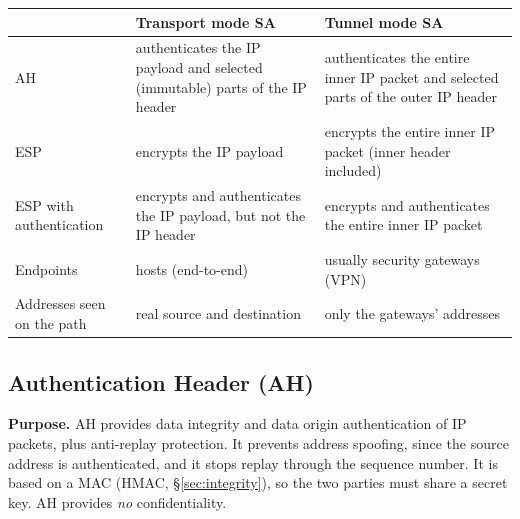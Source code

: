 \begin{center}\small
\begin{tabularx}{\textwidth}{@{}l *{2}{>{\raggedright\arraybackslash}X}@{}}
\toprule
 & Transport mode SA & Tunnel mode SA\\
\midrule
AH & authenticates the IP payload and selected (immutable) parts of the IP header & authenticates the entire inner IP packet and selected parts of the outer IP header\\
ESP & encrypts the IP payload & encrypts the entire inner IP packet (inner header included)\\
ESP with authentication & encrypts and authenticates the IP payload, but not the IP header & encrypts and authenticates the entire inner IP packet\\
Endpoints & hosts (end-to-end) & usually security gateways (VPN)\\
Addresses seen on the path & real source and destination & only the gateways' addresses\\
\bottomrule
\end{tabularx}
\end{center}

\subsection{Authentication Header (AH) \hot\new}

\textbf{Purpose.} AH provides data integrity and data origin authentication of IP packets, plus anti-replay protection. It prevents address spoofing, since the source address is authenticated, and it stops replay through the sequence number. It is based on a MAC (HMAC, \S\ref{sec:integrity}), so the two parties must share a secret key. AH provides \emph{no} confidentiality.

